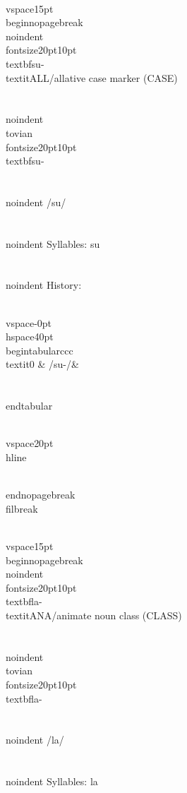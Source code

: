 \\vspace{15pt}
\\begin{nopagebreak}
\\noindent{\\fontsize{20pt}{10pt}\\textbf{su-} } \\textit{ALL/allative case marker} (CASE)\\\\
\\noindent {\\tovian \\fontsize{20pt}{10pt} \\textbf{su-} }\\\\
\\noindent /s{\textprimstress}u/\\\\
\\noindent Syllables: su\\\\


\\noindent History:

\\vspace{-0pt}
\\hspace{40pt}
\\begin{tabular}{ccc}
\\textit{0} & /su-/& \\\\
\\end{tabular}

\\vspace{20pt}\\hline

\\end{nopagebreak}
\\filbreak



\\vspace{15pt}
\\begin{nopagebreak}
\\noindent{\\fontsize{20pt}{10pt}\\textbf{la-} } \\textit{ANA/animate noun class} (CLASS)\\\\
\\noindent {\\tovian \\fontsize{20pt}{10pt} \\textbf{la-} }\\\\
\\noindent /l{\textprimstress}a/\\\\
\\noindent Syllables: la\\\\


